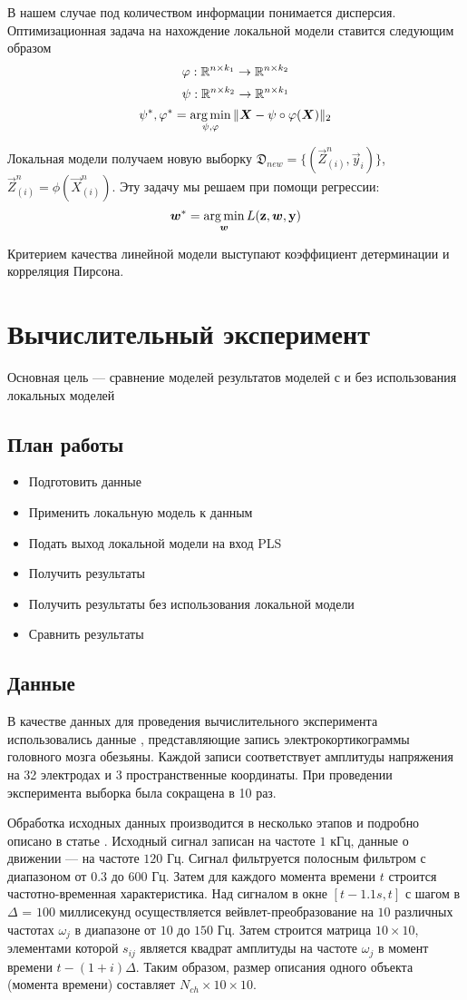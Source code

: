 \documentclass[12pt, twoside]{article}
\begin{document}
В нашем случае под количеством информации понимается дисперсия.
Оптимизационная задача на нахождение локальной модели ставится следующим образом
\[
	\phi: \RR^{n \times k_1} \rightarrow \RR^{n \times k_2}
\]
\[
	\psi: \RR^{n \times k_2} \rightarrow \RR^{n \times k_1}
\]
\[
	\psi^*, \phi^* = \argmin_{\psi, \phi} \|\vec{X} - \psi \circ \phi (\vec{X}) \|_2
\]

Локальная модели получаем новую выборку $\mathfrak{D}_{new} = \{(\vec{Z}_{(i)}^{n}, \vec{y}_i)\}$, $\vec{Z}_{(i)}^{n} = \phi(\vec{X}_{(i)}^{n})$. Эту задачу мы решаем при помощи регрессии:
\[
	\vec{w}^* = \argmin_{\vec{w}} L(\mathbf{z}, \vec{w}, \mathbf{y})
\]

Критерием качества линейной модели выступают коэффициент детерминации и корреляция Пирсона.


\section{Вычислительный эксперимент}
Основная цель --- сравнение моделей результатов моделей с и без использования локальных моделей
\subsection{План работы}
\begin{itemize}
\item Подготовить данные
\item Применить локальную модель к данным
\item Подать выход локальной модели на вход PLS
\item Получить результаты
\item Получить результаты без использования локальной модели 
\item Сравнить результаты
\end{itemize}
\subsection{Данные}
В качестве данных для проведения вычислительного эксперимента использовались данные \cite{chao2010long}, представляющие запись электрокортикограммы головного мозга обезьяны. Каждой записи соответствует амплитуды напряжения на 32 электродах и 3 пространственные координаты.
При проведении эксперимента выборка была сокращена в 10 раз.

Обработка исходных данных производится в несколько этапов и подробно описано в статье \cite{zhao2010ecog}. Исходный сигнал записан на частоте $1$ кГц, данные о движении — на частоте $120 $ Гц. Сигнал фильтруется полосным фильтром с диапазоном от $0.3$ до $600 $ Гц. Затем для каждого момента времени $t$ строится частотно-временная
характеристика. Над сигналом в окне $[t - 1.1s, t]$ с шагом в $\Delta$ = $100$ миллисекунд осуществляется вейвлет-преобразование на $10$ различных частотах $\omega_j$ в диапазоне от $10$ до $150$ Гц. Затем строится матрица $10 \times 10$, элементами которой $s_{ij}$ является квадрат амплитуды на частоте $\omega_j$ в момент времени $t - (1 + i)\Delta$. Таким образом, размер описания одного объекта (момента времени) составляет $N_{ch} \times 10 \times 10$.
\end{document}
